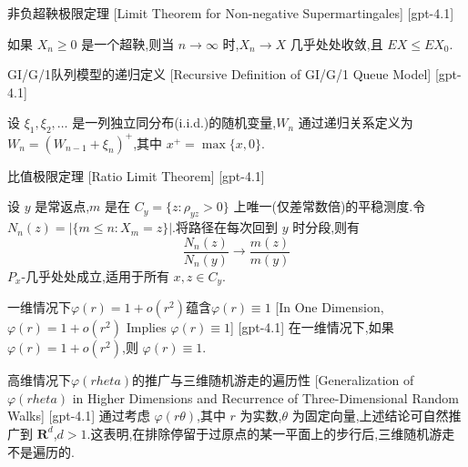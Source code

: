\documentclass[UTF8]{ctexart}
\begin{document}
    
    
    \begin{thm}
        {非负超鞅极限定理}
        [Limit Theorem for Non-negative Supermartingales]
        [gpt-4.1]
        
如果 $X_n \geq 0$ 是一个超鞅,则当 $n \to \infty$ 时,$X_n \to X$ 几乎处处收敛,且 $E X \leq E X_0$.

    \end{thm}
    
    
    
    \begin{dfn}
        {GI/G/1队列模型的递归定义}
        [Recursive Definition of GI/G/1 Queue Model]
        [gpt-4.1]
        
设 $\xi_{1}, \xi_{2}, \ldots$ 是一列独立同分布(i.i.d.)的随机变量,$W_{n}$ 通过递归关系定义为 $W_{n} = (W_{n-1} + \xi_{n})^{+}$,其中 $x^{+} = \max\{x, 0\}$.

    \end{dfn}
    
    
    
    \begin{thm}
        {比值极限定理}
        [Ratio Limit Theorem]
        [gpt-4.1]
        
设 $y$ 是常返点,$m$ 是在 $C_{y} = \{z : \rho_{y z} > 0\}$ 上唯一(仅差常数倍)的平稳测度.令 $N_{n}(z) = |\{m \leq n : X_{m} = z\}|$.将路径在每次回到 $y$ 时分段,则有
\[
\frac{N_{n}(z)}{N_{n}(y)} \to \frac{m(z)}{m(y)}
\]
$P_{x}$-几乎处处成立,适用于所有 $x, z \in C_{y}$.

    \end{thm}
    
    
    
    \begin{ppt}
        [In-One-Dimension-$\varphir-=-1-+-or^2$-Implies-$\varphir-\equiv-1$]
        {一维情况下$\varphi(r) = 1 + o(r^2)$蕴含$\varphi(r) \equiv 1$}
        [In One Dimension, $\varphi(r) = 1 + o(r^2)$ Implies $\varphi(r) \equiv 1$]
        [gpt-4.1]
        在一维情况下,如果 $\varphi(r) = 1 + o(r^2)$,则 $\varphi(r) \equiv 1$.
    \end{ppt}
    
    
    
    \begin{crl}
        {高维情况下$\varphi(r 	heta)$的推广与三维随机游走的遍历性}
        [Generalization of $\varphi(r 	heta)$ in Higher Dimensions and Recurrence of Three-Dimensional Random Walks]
        [gpt-4.1]
        通过考虑 $\varphi(r \theta)$,其中 $r$ 为实数,$\theta$ 为固定向量,上述结论可自然推广到 $\mathbf{R}^d$,$d > 1$.这表明,在排除停留于过原点的某一平面上的步行后,三维随机游走不是遍历的.
    \end{crl}
    
\end{document}
